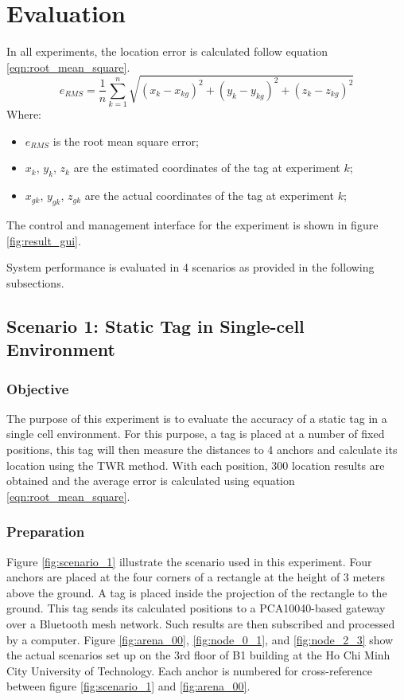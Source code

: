 \documentclass[\main/main.tex]{subfiles}
\begin{document}
\section{Evaluation}

In all experiments, the location error is calculated follow equation \ref{eqn:root_mean_square}.
\begin{equation}
    e_{RMS} = \frac{1}{n} \sum_{k=1}^{n} \sqrt{(x_k-x_{kg})^2 + (y_k-y_{kg})^2 + (z_k-z_{kg})^2}
    \label{eqn:root_mean_square}
\end{equation}
Where:
\begin{itemize}
    \item $e_{RMS}$ is the root mean square error;
    \item $x_k$, $y_k$, $z_k$ are the estimated coordinates of the tag at experiment $k$;
    \item $x_{gk}$, $y_{gk}$, $z_{gk}$ are the actual coordinates of the tag at experiment $k$;
\end{itemize}
The control and management interface for the experiment is shown in figure \ref{fig:result_gui}.

System performance is evaluated in 4 scenarios as provided in the following subsections.
\subsection{Scenario 1: Static Tag in Single-cell Environment}
\label{subsection:scenario_1}
\subsubsection{Objective}
The purpose of this experiment is to evaluate the accuracy of a static tag in a single cell environment.
For this purpose, a tag is placed at a number of fixed positions, this tag will then measure the distances to 4 anchors and calculate its location using the TWR method. With each position, 300 location results are obtained and the average error is calculated using equation \ref{eqn:root_mean_square}.
\subsubsection{Preparation}
Figure \ref{fig:scenario_1} illustrate the scenario used in this experiment. Four anchors are placed at the four corners of a rectangle at the height of 3 meters above the ground. A tag is placed inside the projection of the rectangle to the ground. This tag sends its calculated positions to a PCA10040-based gateway over a Bluetooth mesh network. Such results are then subscribed and processed by a computer. Figure \ref{fig:arena_00}, \ref{fig:node_0_1}, and \ref{fig:node_2_3} show the actual scenarios set up on the 3rd floor of B1 building at the Ho Chi Minh City University of Technology. Each anchor is numbered for cross-reference between figure \ref{fig:scenario_1} and \ref{fig:arena_00}.
\end{document}
